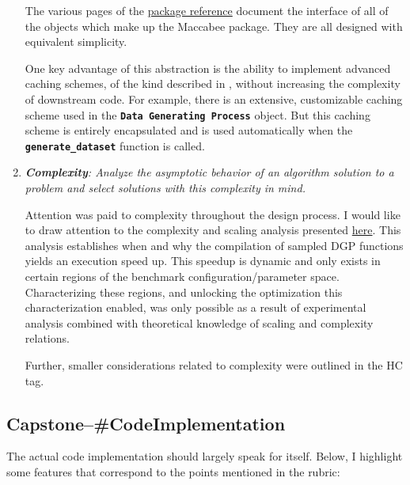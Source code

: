 \documentclass[../main.tex]{subfiles}
\begin{document}
\begin{enumerate}
    The various pages of the \href{\RTDurl/reference.html}{package reference} document the interface of all of the objects which make up the Maccabee package. They are all designed with equivalent simplicity.
    
    One key advantage of this abstraction is the ability to implement advanced caching schemes, of the kind described in , without increasing the complexity of downstream code. For example, there is an extensive, customizable caching scheme used in the \textbf{\texttt{Data Generating Process}} object. But this caching scheme is entirely encapsulated and is used automatically when the \textbf{\lstinline{generate_dataset}} function is called.
    
    \item \textit{\textbf{Complexity}: Analyze the asymptotic behavior of an algorithm solution to a problem and select solutions with this complexity in mind.}
    
    Attention was paid to complexity throughout the design process. I would like to draw attention to the complexity and scaling analysis presented \href{\RTDurl/advanced/parallelization.html}{here}. This analysis establishes when and why the compilation of sampled DGP functions yields an execution speed up. This speedup is dynamic and only exists in certain regions of the benchmark configuration/parameter space. Characterizing these regions, and unlocking the optimization this characterization enabled, was only possible as a result of experimental analysis combined with theoretical knowledge of scaling and complexity relations.
    
    Further, smaller considerations related to complexity were outlined in the  HC tag. 
    
\end{enumerate}


\subsection*{\textbf{Capstone--\#CodeImplementation}}
\label{lo:CodeImplementation}

The actual code implementation should largely speak for itself. Below, I highlight some features that correspond to the points mentioned in the rubric:
\end{document}
